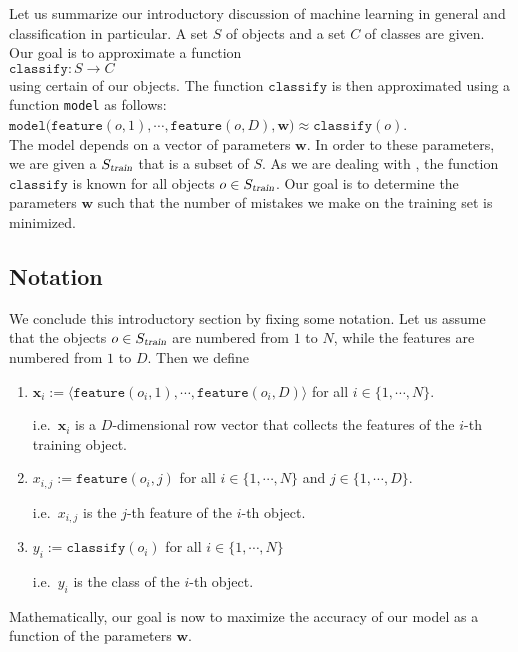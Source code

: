 Let us summarize our introductory discussion of machine learning in general and classification in particular.
A set $S$ of objects and a set $C$ of classes are given.  Our goal is to approximate a function
\\[0.2cm]
\hspace*{1.3cm}
$\mathtt{classify}: S \rightarrow C$
\\[0.2cm]
using certain  of our objects.  The function $\mathtt{classify}$ is then approximated using a function
\texttt{model} as follows:
\\[0.2cm]
\hspace*{1.3cm}
$\mathtt{model}\bigl(\mathtt{feature}(o,1), \cdots, \mathtt{feature}(o,D), \mathbf{w}\bigr) \approx \mathtt{classify}(o)$.
\\[0.2cm]
The model depends on a vector of parameters $\mathbf{w}$.  In order to  these parameters, we are given a 
 $S_\textsl{train}$ that is a subset of $S$.  As we are dealing with , the function 
$\mathtt{classify}$ is known for all objects $o \in S_\textsl{train}$.   Our goal is to determine the parameters $\mathbf{w}$ such that the
number of mistakes we make on the training set is minimized.  

\subsection{Notation}
We conclude this introductory section by fixing some notation.  Let us assume that the objects $o \in S_\textsl{train}$
are numbered 
from $1$ to $N$, while the features are numbered from $1$ to $D$.  Then we define
\begin{enumerate}
\item $\textbf{x}_i := \langle\mathtt{feature}(o_i, 1), \cdots, \mathtt{feature}(o_i, D)\rangle$ \quad for all $i \in \{1, \cdots, N\}$.
  
      i.e.~$\mathbf{x}_i$ is a $D$-dimensional row vector that collects the features of the $i$-th training object.
\item $x_{i,j} := \mathtt{feature}(o_i, j)$ \quad for all $i \in \{1, \cdots, N\}$ and $j \in \{1, \cdots, D\}$.

      i.e.~$x_{i,j}$ is the $j$-th feature of the $i$-th object.
\item $y_i := \mathtt{classify}(o_i)$ \quad for all $i \in \{1, \cdots, N\}$

      i.e.~$y_i$ is the class of the $i$-th object.
\end{enumerate}
Mathematically, our goal is now to maximize the accuracy of our model as a function of the parameters $\mathbf{w}$.

